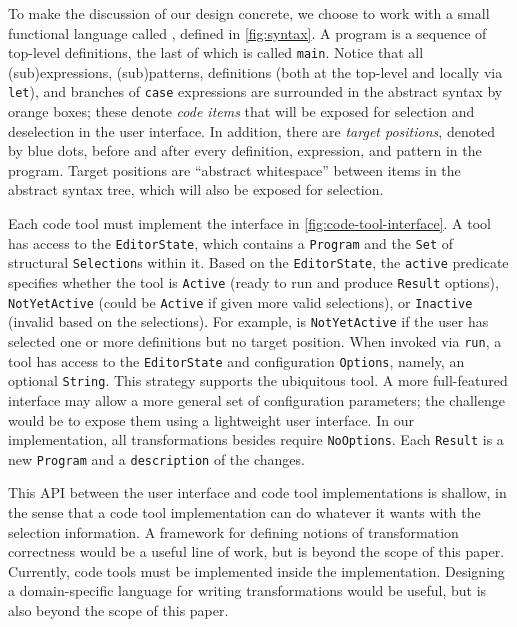 \parahead{\little{}}

\noindent
To make the discussion of our design concrete, we choose to work with
a small functional language called \little{}, defined in \autoref{fig:syntax}.
A \little{} program is a sequence of top-level definitions, the last of which is
called \verb+main+. Notice that all (sub)expressions, (sub)patterns, definitions
(both at the top-level and locally via \verb+let+), and branches of \verb+case+
expressions are surrounded in the abstract syntax by orange boxes; these denote
\emph{code items} that will be exposed for selection and deselection in the user
interface. In addition, there are \emph{target positions}, denoted by blue
dots, before and after every definition, expression, and pattern in the program. Target
positions are ``abstract whitespace'' between items in the abstract syntax tree,
which will also be exposed for selection.







Each code tool must implement the interface in \autoref{fig:code-tool-interface}.
A tool has access to the \verb+EditorState+, which contains a
\verb+Program+ and the \verb+Set+ of structural \verb+Selection+s within it.
Based on the \verb+EditorState+, the \verb+active+ predicate specifies
whether the tool is
\verb+Active+ (ready to run and produce \verb+Result+ options),
\verb+NotYetActive+ (could be \verb+Active+ if given more valid selections), or
\verb+Inactive+ (invalid based on the selections).
For example,  is \verb+NotYetActive+ if the user has
selected one or more definitions but no target position.
%
When invoked via \verb+run+, a tool has access to the \verb+EditorState+ and
configuration \verb+Options+, namely, an optional \verb+String+. This strategy
supports the ubiquitous  tool. A more full-featured interface
may allow a more general set of configuration parameters; the challenge would be
to expose them using a lightweight user interface. In our implementation, all
transformations besides  require \verb+NoOptions+. Each
\verb+Result+ is a new \verb+Program+ and a \verb+description+ of the changes.

This API between the user interface and code tool implementations is
shallow, in the sense that a code tool implementation can do whatever it
wants with the selection information. A framework for defining notions of
transformation correctness would be a useful line of work, but is beyond the scope of
this paper. Currently, code tools must be implemented inside the
\deuce{} implementation. Designing a domain-specific language for writing
transformations would be useful, but is also beyond the scope of this paper.
